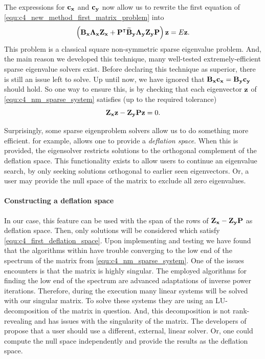The expressions for $\vb{c_x}$ and $\vb{c_y}$ now allow us to rewrite the first equation of \eqref{equ:c4_new_method_first_matrix_problem} into
\begin{equation}\label{equ:c4_nm_sparse_system}
    \left(\vb{B_x}\vb{\Lambda_x} \vb{Z_x} + {\vb{P}}^\intercal\vb{\widetilde{B}_y}\vb{\Lambda_y}  \vb{Z_y} \vb{P}\right) \vb{z} = E \vb{z} \text{.}
\end{equation}
This problem is a classical square non-symmetric sparse eigenvalue problem. And, the main reason we developed this technique, many well-tested extremely-efficient sparse eigenvalue solvers exist. Before declaring this technique as superior, there is still an issue left to solve. Up until now, we have ignored that $\vb{B_x} \vb{c_x} = \vb{B_y} \vb{c_y}$ should hold. So one way to ensure this, is by checking that each eigenvector $\vb{z}$ of \eqref{equ:c4_nm_sparse_system} satisfies (up to the required tolerance)
\begin{equation}\label{equ:c4_first_deflation_space}
    \vb{Z_x} \vb{z} -\vb{Z_y} \vb{P} \vb{z} =0 \text{.}
\end{equation}

Surprisingly, some sparse eigenproblem solvers allow us to do something more efficient. \slepc{} \cite{hernandez_slepc_2005} for example, allows one to provide a \emph{deflation space}. When this is provided, the eigensolver restricts solutions to the orthogonal complement of the deflation space. This functionality exists to allow users to continue an eigenvalue search, by only seeking solutions orthogonal to earlier seen eigenvectors. Or, a user may provide the null space of the matrix to exclude all zero eigenvalues.

\paragraph{Constructing a deflation space}
In our case, this feature can be used with the span of the rows of $\vb{Z_x} - \vb{Z_y} \vb{P}$ as deflation space. Then, only solutions will be considered which satisfy \eqref{equ:c4_first_deflation_space}. Upon implementing and testing we have found that the algorithms within \slepc{} have trouble converging to the low end of the spectrum of the matrix from \eqref{equ:c4_nm_sparse_system}. One of  the issues \slepc{} encounters is that the matrix is highly singular. The employed algorithms for finding the low end of the spectrum are advanced adaptations of inverse power iterations. Therefore, during the execution many linear systems will be solved with our singular matrix. To solve these systems they are using an LU-decomposition of the matrix in question. And, this decomposition is not rank-revealing and has issues with the singularity of the matrix. The developers of \slepc{} propose that a user should use a different, external, linear solver. Or, one could compute the null space independently and provide the results as the deflation space.

